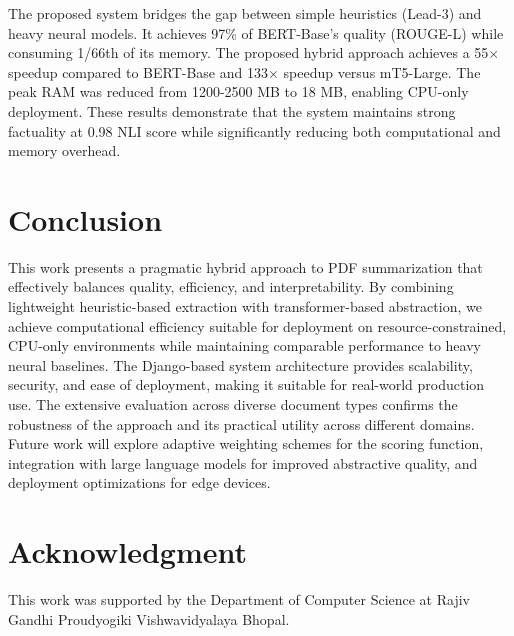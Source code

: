 \documentclass[conference]{IEEEtran}
\begin{document}
The proposed system bridges the gap between simple heuristics (Lead-3) and heavy neural models. It achieves 97\% of BERT-Base's quality (ROUGE-L) while consuming 1/66th of its memory. The proposed hybrid approach achieves a 55× speedup compared to BERT-Base and 133× speedup versus mT5-Large. The peak RAM was reduced from 1200-2500 MB to 18 MB, enabling CPU-only deployment. These results demonstrate that the system maintains strong factuality at 0.98 NLI score while significantly reducing both computational and memory overhead.

\section{Conclusion}

This work presents a pragmatic hybrid approach to PDF summarization that effectively balances quality, efficiency, and interpretability. By combining lightweight heuristic-based extraction with transformer-based abstraction, we achieve computational efficiency suitable for deployment on resource-constrained, CPU-only environments while maintaining comparable performance to heavy neural baselines. The Django-based system architecture provides scalability, security, and ease of deployment, making it suitable for real-world production use. The extensive evaluation across diverse document types confirms the robustness of the approach and its practical utility across different domains. Future work will explore adaptive weighting schemes for the scoring function, integration with large language models for improved abstractive quality, and deployment optimizations for edge devices.

\section*{Acknowledgment}

This work was supported by the Department of Computer Science at Rajiv Gandhi Proudyogiki Vishwavidyalaya Bhopal.
\end{document}
